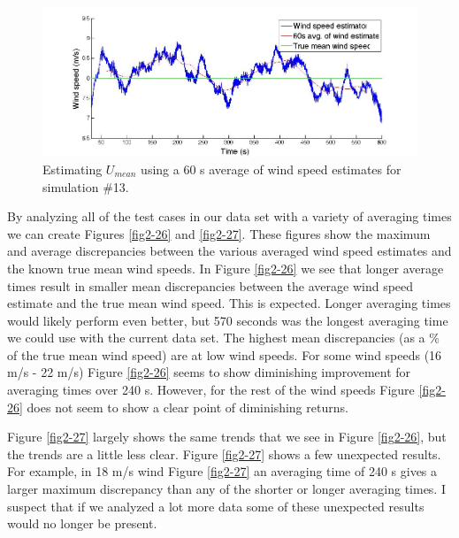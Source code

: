 \begin{figure}[htbp]
	\centering
		\includegraphics[width = \linewidth]{Figures/ch2Figures/fig2-25.jpg}
		
	\caption{Estimating $U_{mean}$ using a 60 s average of wind speed estimates for simulation \#13.}
	\label{fig2-25}
\end{figure}

By analyzing all of the test cases in our data set with a variety of averaging times we can create Figures \ref{fig2-26} and \ref{fig2-27}. These figures show the maximum and average discrepancies between the various averaged wind speed estimates and the known true mean wind speeds. In Figure \ref{fig2-26} we see that longer average times result in smaller mean discrepancies between the average wind speed estimate and the true mean wind speed. This is expected. Longer averaging times would likely perform even better, but 570 seconds was the longest averaging time we could use with the current data set. The highest mean discrepancies (as a \% of the true mean wind speed) are at low wind speeds. For some wind speeds (16 m/s - 22 m/s) Figure \ref{fig2-26} seems to show diminishing improvement for averaging times over 240 s. However, for the rest of the wind speeds Figure \ref{fig2-26} does not seem to show a clear point of diminishing returns.

Figure \ref{fig2-27} largely shows the same trends that we see in Figure \ref{fig2-26}, but the trends are a little less clear. Figure \ref{fig2-27} shows a few unexpected results. For example, in 18 m/s wind Figure \ref{fig2-27} an averaging time of 240 s gives a larger maximum discrepancy than any of the shorter or longer averaging times. I suspect that if we analyzed a lot more data some of these unexpected results would no longer be present.



